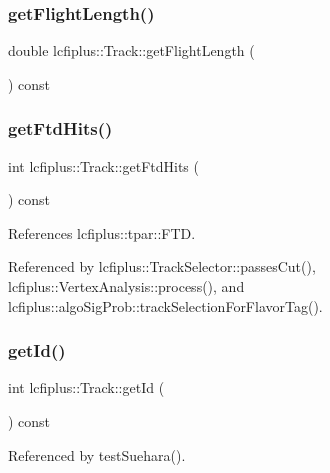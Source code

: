 \subsubsection{get\+Flight\+Length()}
{\footnotesize\ttfamily double lcfiplus\+::\+Track\+::get\+Flight\+Length (\begin{DoxyParamCaption}{ }\end{DoxyParamCaption}) const\hspace{0.3cm}{\ttfamily [inline]}}

\mbox{\label{classlcfiplus_1_1Track_a9359e1fea82b06c3eabe004f3fb590ff}} 
\subsubsection{get\+Ftd\+Hits()}
{\footnotesize\ttfamily int lcfiplus\+::\+Track\+::get\+Ftd\+Hits (\begin{DoxyParamCaption}{ }\end{DoxyParamCaption}) const\hspace{0.3cm}{\ttfamily [inline]}}



References lcfiplus\+::tpar\+::\+F\+TD.



Referenced by lcfiplus\+::\+Track\+Selector\+::passes\+Cut(), lcfiplus\+::\+Vertex\+Analysis\+::process(), and lcfiplus\+::algo\+Sig\+Prob\+::track\+Selection\+For\+Flavor\+Tag().

\mbox{\label{classlcfiplus_1_1Track_a65deacd051fcf6ff9f33fb48816b6d06}} 
\subsubsection{get\+Id()}
{\footnotesize\ttfamily int lcfiplus\+::\+Track\+::get\+Id (\begin{DoxyParamCaption}{ }\end{DoxyParamCaption}) const\hspace{0.3cm}{\ttfamily [inline]}}



Referenced by test\+Suehara().

\mbox{\label{classlcfiplus_1_1Track_a10be4459d6f35ec29c715a4a118a9487}} 
